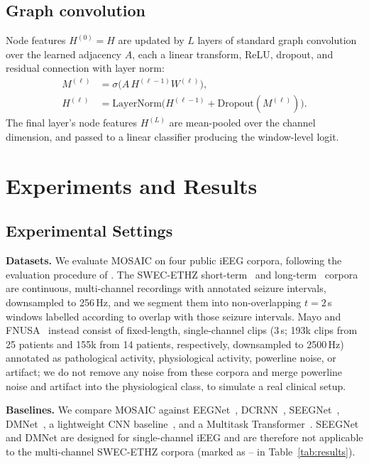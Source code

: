 \documentclass[letterpaper]{article}
\begin{document}
\subsection{Graph convolution}
\label{ssec:gcn}

Node features $H^{(0)} = H$ are updated by $L$ layers of standard graph
convolution over the learned adjacency $A$, each a linear transform,
ReLU, dropout, and residual connection with layer norm:
\begin{equation}
\begin{aligned}
M^{(\ell)} &= \sigma\big(A\, H^{(\ell-1)} W^{(\ell)}\big), \\
H^{(\ell)} &= \mathrm{LayerNorm}\big(H^{(\ell-1)} + \mathrm{Dropout}(M^{(\ell)})\big).
\end{aligned}
\label{eq:gcn-layer}
\end{equation}
The final layer's node features $H^{(L)}$ are mean-pooled over the
channel dimension, and passed to a linear
classifier producing the window-level logit.

\section{Experiments and Results}
\label{sec:experiments}

\subsection{Experimental Settings}
\label{ssec:setup}

\noindent\textbf{Datasets.} We evaluate MOSAIC on four public iEEG corpora,
following the evaluation procedure of \cite{carzaniga2026foundation}. The
SWEC-ETHZ short-term~\cite{burrello2019hyperdimensional} and
long-term~\cite{burrello2019laelaps} corpora are continuous,
multi-channel recordings with annotated seizure intervals, downsampled to
256\,Hz, and we segment them into non-overlapping $t = 2$\,s windows
labelled according to overlap with those seizure intervals. Mayo and
FNUSA~\cite{nejedly2020multicenter} instead consist of fixed-length,
single-channel clips (3\,s; 193k clips from 25 patients and 155k from 14
patients, respectively, downsampled to 2500\,Hz) annotated as pathological activity, physiological activity, powerline
noise, or artifact; we do not remove any noise from these corpora and merge
powerline noise and artifact into
the physiological class, to simulate a real clinical setup.

\noindent\textbf{Baselines.} We compare MOSAIC against
EEGNet~\cite{lawhern2018eegnet}, DCRNN~\cite{tang2022selfsupervised},
SEEGNet~\cite{wang2022seegnet}, DMNet~\cite{tu2024dmnet}, a lightweight
CNN baseline~\cite{si2023lightweight}, and a Multitask
Transformer~\cite{sun2025multitask}. SEEGNet and DMNet are designed for
single-channel iEEG and are therefore not applicable to the
multi-channel SWEC-ETHZ corpora (marked as -- in Table~\ref{tab:results}).
\end{document}
